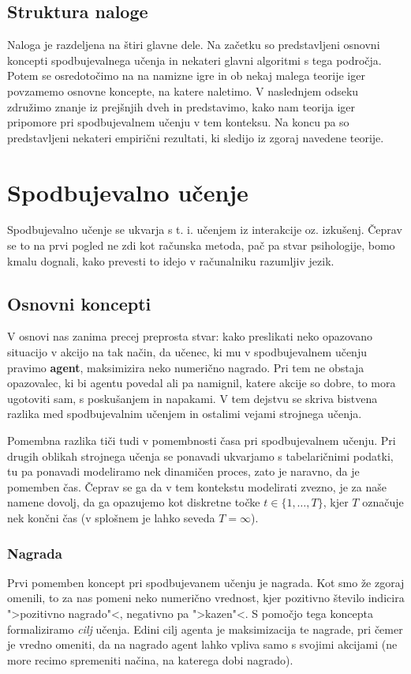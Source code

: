 \documentclass[12pt,a4paper]{amsart}
\theoremstyle{definition} %
\theoremstyle{plain} %
\begin{document}
\subsection{Struktura naloge}
Naloga je razdeljena na štiri glavne dele. Na začetku so predstavljeni osnovni koncepti 
spodbujevalnega učenja in nekateri glavni algoritmi s tega področja. Potem se osredotočimo na 
na namizne igre in ob nekaj malega teorije iger povzamemo osnovne koncepte, na katere naletimo. 
V naslednjem odseku združimo znanje iz prejšnjih dveh in predstavimo, kako nam teorija iger 
pripomore pri spodbujevalnem učenju v tem konteksu. Na koncu pa so predstavljeni nekateri empirični
rezultati, ki sledijo iz zgoraj navedene teorije.

\section{Spodbujevalno učenje}
Spodbujevalno učenje se ukvarja s t. i. učenjem iz interakcije oz. izkušenj. Čeprav se to na prvi 
pogled ne zdi kot računska metoda, pač pa stvar psihologije, bomo kmalu dognali, kako prevesti 
to idejo v računalniku razumljiv jezik.

\subsection{Osnovni koncepti}
V osnovi nas zanima precej preprosta stvar: kako preslikati neko opazovano situacijo v akcijo na 
tak način, da učenec, ki mu v spodbujevalnem učenju pravimo \textbf{agent}, maksimizira neko 
numerično nagrado. Pri tem ne obstaja opazovalec, ki bi agentu povedal ali pa namignil, katere 
akcije so dobre, to mora ugotoviti sam, s poskušanjem in napakami. V tem dejstvu se skriva 
bistvena razlika med spodbujevalnim učenjem in ostalimi vejami strojnega učenja. 

Pomembna razlika tiči tudi v pomembnosti časa pri spodbujevalnem učenju. Pri drugih oblikah 
strojnega učenja se ponavadi ukvarjamo s tabelaričnimi podatki, tu pa ponavadi modeliramo nek 
dinamičen proces, zato je naravno, da je pomemben čas. Čeprav se ga da v tem kontekstu 
modelirati zvezno, je za naše namene dovolj, da ga opazujemo kot diskretne točke $t \in 
\{1, \dots, T\} $, kjer $T$ označuje nek končni čas (v splošnem je lahko seveda $T = \infty$).

\subsubsection{Nagrada}
Prvi pomemben koncept pri spodbujevanem učenju je nagrada. Kot smo že zgoraj omenili, to za nas 
pomeni neko numerično vrednost, kjer pozitivno število indicira ">pozitivno nagrado"<, negativno pa 
">kazen"<. S pomočjo tega koncepta formaliziramo \textit{cilj} učenja. Edini cilj agenta je 
maksimizacija te nagrade, pri čemer je vredno omeniti, da na nagrado agent lahko vpliva samo 
s svojimi akcijami (ne more recimo spremeniti načina, na katerega dobi nagrado). 
\end{document}
